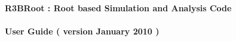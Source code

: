 \begin{titlepage}
\begin{center}
\noindent {\large \textbf{ }} \\
\vspace*{0.3cm}
\noindent {\LARGE \textbf{ }} \\
\noindent \textbf{ } \\
\vspace*{0.5cm}
\noindent \Huge \textbf{R3BRoot : Root based Simulation and Analysis Code } \\
\vspace*{0.3cm}
\noindent \large {  } \\
\vspace*{0.3cm}
\noindent \LARGE \textbf{ User Guide ( version January 2010 )} \\
\vspace*{0.3cm}
\noindent \Large  \\
\noindent \Large  \\
\vspace*{0.4cm}
\noindent \large { }
\noindent \LARGE   \\
\vspace*{0.8cm}
\noindent {\Huge \textbf{  }} \\
\vspace*{0.8cm}
\noindent \Large  \\
\vspace*{0.2cm}
\noindent \Large  \\
\vspace*{0.2cm}
\noindent \large  \\
\vspace*{0.5cm}
\end{center}
\noindent \large  \\
\begin{center}
\noindent \large 
\end{center}
\end{titlepage}
\sloppy

\titlepage
